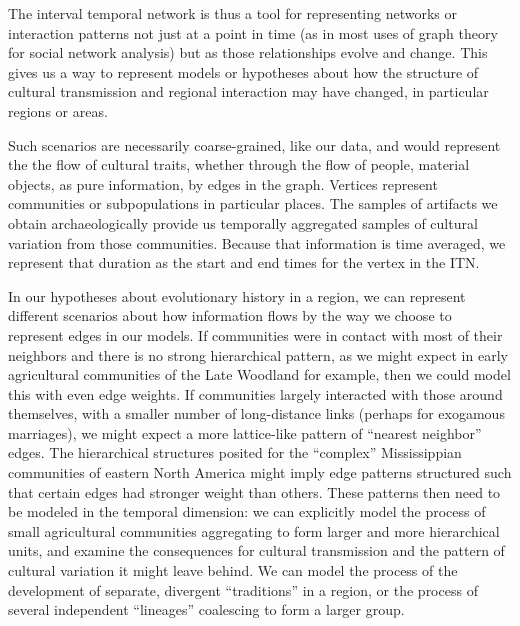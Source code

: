     The interval temporal network is thus a tool for representing networks or interaction patterns not just at a point in time (as in most uses of graph theory for social network analysis) but as those relationships evolve and change.  This gives us a way to represent models or hypotheses about how the structure of cultural transmission and regional interaction may have changed, in particular regions or areas.  
    
    Such scenarios are necessarily coarse-grained, like our data, and would represent the the flow of cultural traits, whether through the flow of people, material objects, as pure information, by edges in the graph.  Vertices represent communities or subpopulations in particular places.  The samples of artifacts we obtain archaeologically provide us temporally aggregated  samples of cultural variation from those communities.  Because that information is time averaged, we represent that duration as the start and end times for the vertex in the ITN.  
    
    In our hypotheses about evolutionary history in a region, we can represent different scenarios about how information flows by the way we choose to represent edges in our models.  If communities were in contact with most of their neighbors and there is no strong hierarchical pattern, as we might expect in early agricultural communities of the Late Woodland for example, then we could model this with even edge weights.  If communities largely interacted with those around themselves, with a smaller number of long-distance links (perhaps for exogamous marriages), we might expect a more lattice-like pattern of ``nearest neighbor'' edges.  The hierarchical structures posited for the ``complex'' Mississippian communities of eastern North America might imply edge patterns structured such that certain edges had stronger weight than others.  These patterns then need to be modeled in the temporal dimension:  we can explicitly model the process of small agricultural communities aggregating to form larger and more hierarchical units, and examine the consequences for cultural transmission and the pattern of cultural variation it might leave behind.  We can model the process of the development of separate, divergent ``traditions'' in a region, or the process of several independent ``lineages'' coalescing to form a larger group.   
    
